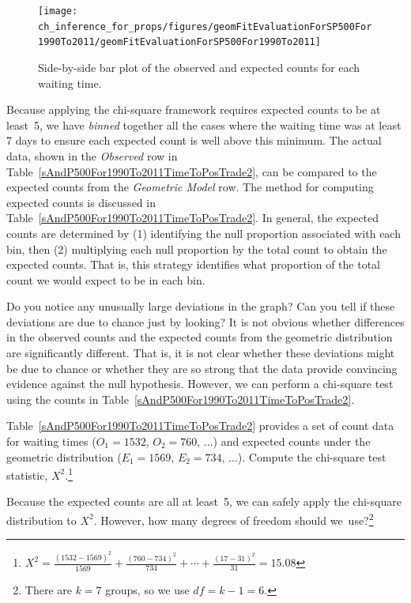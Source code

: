 \begin{figure}
\centering
\texttt{[image: ch\_inference\_for\_props/figures/geomFitEvaluationForSP500For1990To2011/geomFitEvaluationForSP500For1990To2011]}
\caption{Side-by-side bar plot of the observed and expected counts for each waiting time.}
\label{geomFitEvaluationForSP500For1990To2011}
\end{figure}

Because applying the chi-square framework requires expected counts to be at least~5, we have \emph{binned} together all the cases where the waiting time was at least 7 days to ensure each expected count is well above this minimum. The actual data, shown in the \emph{Observed} row in Table~\ref{sAndP500For1990To2011TimeToPosTrade2}, can be compared to the expected counts from the \emph{Geometric Model} row. The method for computing expected counts is discussed in Table~\ref{sAndP500For1990To2011TimeToPosTrade2}. In general, the expected counts are determined by (1) identifying the null proportion associated with each bin, then (2) multiplying each null proportion by the total count to obtain the expected counts. That is, this strategy identifies what proportion of the total count we would expect to be in each bin.

\begin{example}{Do you notice any unusually large deviations in the graph? Can you tell if these deviations are due to chance just by looking?}
It is not obvious whether differences in the observed counts and the expected counts from the geometric distribution are significantly different. That is, it is not clear whether these deviations might be due to chance or whether they are so strong that the data provide convincing evidence against the null hypothesis. However, we can perform a chi-square test using the counts in Table~\ref{sAndP500For1990To2011TimeToPosTrade2}.
\end{example}

\begin{exercise}
Table~\ref{sAndP500For1990To2011TimeToPosTrade2} provides a set of count data for waiting times ($O_1=1532$, $O_2=760$, ...) and expected counts under the geometric distribution ($E_1=1569$, $E_2=734$, ...). Compute the chi-square test statistic, $X^2$.\footnote{$X^2=\frac{(1532-1569)^2}{1569} + \frac{(760-734)^2}{734} + \cdots + \frac{(17-31)^2}{31} = 15.08$}
\end{exercise}

\begin{exercise}
Because the expected counts are all at least~5, we can safely apply the chi-square distribution to $X^2$. However, how many degrees of freedom should we~use?\footnote{There are $k=7$ groups, so we use $df=k-1=6$.}
\end{exercise}


